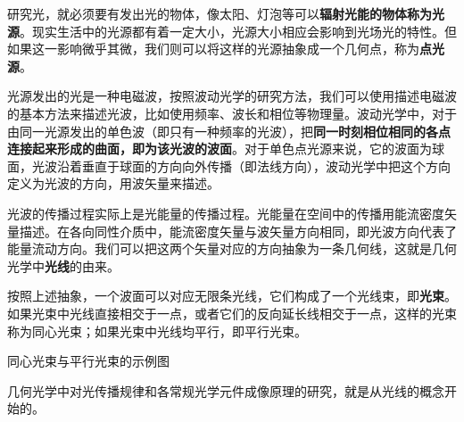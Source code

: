 

研究光，就必须要有发出光的物体，像太阳、灯泡等可以\textbf{辐射光能的物体称为光源}。现实生活中的光源都有着一定大小，光源大小相应会影响到光场光的特性。但如果这一影响微乎其微，我们则可以将这样的光源抽象成一个几何点，称为\textbf{点光源}。

光源发出的光是一种电磁波，按照波动光学的研究方法，我们可以使用描述电磁波的基本方法来描述光波，比如使用频率、波长和相位等物理量。波动光学中，对于由同一光源发出的单色波（即只有一种频率的光波），把\textbf{同一时刻相位相同的各点连接起来形成的曲面，即为该光波的波面}。对于单色点光源来说，它的波面为球面，光波沿着垂直于球面的方向向外传播（即法线方向），波动光学中把这个方向定义为光波的方向，用波矢量来描述。

光波的传播过程实际上是光能量的传播过程。光能量在空间中的传播用能流密度矢量描述。在各向同性介质中，能流密度矢量与波矢量方向相同，即光波方向代表了能量流动方向。我们可以把这两个矢量对应的方向抽象为一条几何线，这就是几何光学中\textbf{光线}的由来。

按照上述抽象，一个波面可以对应无限条光线，它们构成了一个光线束，即\textbf{光束}。如果光束中光线直接相交于一点，或者它们的反向延长线相交于一点，这样的光束称为同心光束；如果光束中光线均平行，即平行光束。

\begin{issues}
\issueTODO 同心光束与平行光束的示例图
\end{issues}

几何光学中对光传播规律和各常规光学元件成像原理的研究，就是从光线的概念开始的。
